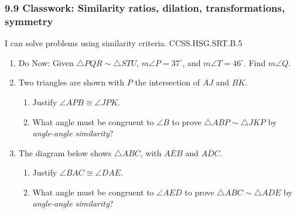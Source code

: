 \documentclass[12pt, twoside]{article}
\begin{document}
\subsubsection*{9.9 Classwork: Similarity ratios, dilation, transformations, symmetry}
I can solve problems using similarity criteria. \hfill CCSS.HSG.SRT.B.5
  \begin{enumerate}

\item Do Now: Given $\triangle PQR \sim \triangle STU$, $m\angle P=37^\circ$, and $m\angle T=46^\circ$. Find $m\angle Q$. \vspace{4cm}

\item Two triangles are shown with $P$ the intersection of $\overline{AJ}$ and $\overline{BK}$.
\begin{multicols}{2}
  \begin{enumerate}
      \item Justify $\angle APB \cong \angle JPK$.
      \item What angle must be congruent to $\angle B$ to prove $\triangle ABP \sim \triangle JKP$ by \emph{angle-angle similarity}? \vspace{2cm}
      \end{enumerate}
  \end{multicols}
    \vspace{1cm}

\item The diagram below shows $\triangle ABC$, with $\overline{AEB}$ and $\overline{ADC}$.
  \begin{multicols}{2}
    \begin{enumerate}
      \item Justify $\angle BAC \cong \angle DAE$.
      \item What angle must be congruent to $\angle AED$ to prove $\triangle ABC \sim \triangle ADE$ by \emph{angle-angle similarity}? \vspace{3cm}
    \end{enumerate}
  \end{multicols}


\end{enumerate}
\end{document}
